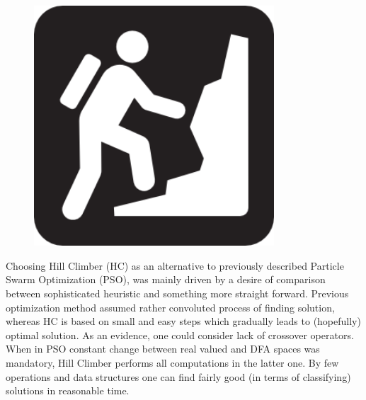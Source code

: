 \documentclass{mini}
\begin{document}
\begin{figure}
    \begin{center}
        \includegraphics[width=0.8\textwidth]{./images/hc_1.png}
    \end{center}
\end{figure}

Choosing Hill Climber (HC) as an alternative to previously described Particle Swarm Optimization (PSO), was mainly driven by a desire of comparison between sophisticated heuristic and something more straight forward. Previous optimization method assumed rather convoluted process of finding solution, whereas HC is based on small and easy steps which gradually leads to (hopefully) optimal solution. As an evidence, one could consider lack of crossover operators. When in PSO constant change between real valued and DFA spaces was mandatory, Hill Climber performs all computations in the latter one. By few operations and data structures one can find fairly good (in terms of classifying) solutions in reasonable time. 

\end{document}
